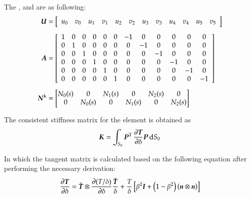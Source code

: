 The ,  and  are as following:
\begin{align}
  \boldsymbol{U} &= \left [
    \begin{array}{c c c c c c c c c c c c}
      u_0 & v_0 & u_1 & v_1 & u_2 & v_2 & u_3 & v_3 & u_4 & v_4 & u_5 & v_5
    \end{array}\right ]\\[1ex]
  \boldsymbol{A} &= \left [\begin{array}{c c c c c c c c c c c c}
      1 & 0 & 0 & 0& 0 & 0 & -1& 0 & 0 &0 &0 &0\\
      0 &1& 0&0 &0 &0 &0 & -1& 0& 0 & 0 &0\\
      0 &0& 1&0 &0 &0 &0 & 0& -1& 0 & 0 &0\\
      0 &0& 0&1 &0 &0 &0 & 0& 0& -1 & 0 &0\\
      0 &0& 0&0 &1 &0 &0 & 0& 0& 0 & -1 &0\\
      0 &0& 0&0 &0 &1 &0 & 0& 0& 0 & 0 &-1
    \end{array} \right ]\\[1ex]
  \boldsymbol{N}^\mathrm{k} &= \begin{bmatrix}
    N_0(s) & 0 & N_1(s) &0 & N_2(s) & 0\\
    0 & N_0(s)& 0 &N_1(s)& 0 & N_2(s)
  \end{bmatrix}
\end{align}

The consistent stiffness matrix for the element is obtained as
\begin{equation}
  \label{eq:cohesive_stiffness}
  \boldsymbol{K}    =    \int_{S_0}    \boldsymbol{P}^\mathrm{T}\,
    \frac{\partial{\ensuremath{\boldsymbol{T}}}} {\partial{\delta}} \boldsymbol{P} \,\mathrm{d}
    S_0
\end{equation}

In which the tangent matrix is calculated based on the following
equation after performing the necessary derivation:
\begin{equation}
  \label{eq:tangent_cohesive}
  \frac{\partial{\ensuremath{\boldsymbol{T}}}} {\partial{\delta}} = \hat{\boldsymbol{T}} \otimes
  \frac                       {\partial{(T/\delta)}}{\partial{\delta}}
  \frac{\hat{\boldsymbol{T}}}{\delta}+ \frac{T}{\delta}  \left[ \beta^2 \boldsymbol{I} +
  \left(1-\beta^2\right) \left(\boldsymbol{n} \otimes \boldsymbol{n}\right)\right]
\end{equation}



